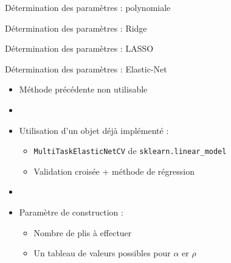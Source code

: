 \documentclass{beamer}
\begin{document}
\begin{frame}{Détermination des paramètres : polynomiale}
  \begin{center}
  \end{center}
\end{frame}

\begin{frame}{Détermination des paramètres : Ridge}
  \begin{center}
  \end{center}
\end{frame}

\begin{frame}{Détermination des paramètres : LASSO}
  \begin{center}
  \end{center}
\end{frame}

\begin{frame}{Détermination des paramètres : Elastic-Net}
  \begin{itemize}
    \item Méthode précédente non utilisable
    \item[]
    \item Utilisation d'un objet déjà implémenté :
    \begin{itemize}
      \item \texttt{MultiTaskElasticNetCV} de \texttt{sklearn.linear\_model}
      \item Validation croisée + méthode de régression
    \end{itemize}
    \item[]
    \item Paramètre de construction :
    \begin{itemize}
      \item Nombre de plis à effectuer
      \item Un tableau de valeurs possibles pour $\alpha$ er $\rho$
    \end{itemize}
  \end{itemize}
\end{frame}
\end{document}

